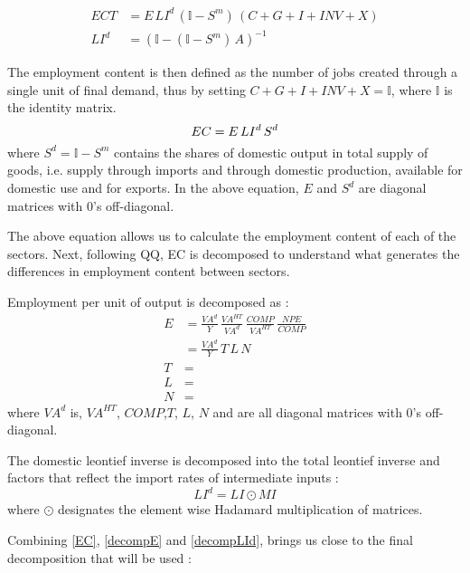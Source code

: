 \documentclass[12pt,english]{article}
\newcommand{\mli}[1]{\mathit{#1}}
\begin{document}
\begin{align}
	ECT	 &= E\, LI^d \, (\mathbb{I} - S^m)\, (C + G + I + INV + X) \label{IO3} \\ 
	LI^d &= (\mathbb{I} - (\mathbb{I}-S^m)\, A)^{-1} \label{leontiefInverse_d}
\end{align}

The employment content is then defined as the number of jobs created through a single unit of final demand, thus by setting $C + G + I + INV + X=\mathbb{I}$, where $\mathbb{I}$ is the identity matrix. 
\begin{equation}
	EC	= E\, LI^d \, S^d \label{EC} \\ 
\end{equation}
where $S^d = \mathbb{I} - S^m$ contains the shares of domestic output in total supply of goods, i.e. supply through imports and through domestic production, available for domestic use and for exports. In the above equation, $E$ and $S^d$ are diagonal matrices with 0's off-diagonal.


The above equation allows us to calculate the employment content of each of the sectors. Next, following QQ, EC is decomposed to understand what generates the differences in employment content between sectors. 

Employment per unit of output is decomposed as :
\begin{align}
	E &= \frac{\mli{VA^d}}{Y} \, \frac{\mli{VA}^{HT}}{\mli{VA}^d} \, \frac{\mli{COMP}}{\mli{VA^{HT}}} \, \frac{\mli{NPE}}{\mli{COMP}}   \label{decompE} \\ 
	&= \frac{\mli{VA^d}}{Y} \, T \, L \, N \\
	T &= \\
	L &= \\
	N &= 
\end{align}
where $\mli{VA^d}$ is, $\mli{VA}^{HT}$, $\mli{COMP}$,$T$, $L$, $N$ and are all diagonal matrices with 0's off-diagonal.

The domestic leontief inverse is decomposed into the total leontief inverse and factors that reflect the import rates of intermediate inputs : 
\begin{equation}
	LI^d = \mli{LI} \odot \mli{MI} \label{decompLId}
\end{equation}
where $\odot$ designates the element wise Hadamard multiplication of matrices.

Combining \ref{EC}, \ref{decompE} and \ref{decompLId}, brings us close to the final decomposition that will be used :
\end{document}
